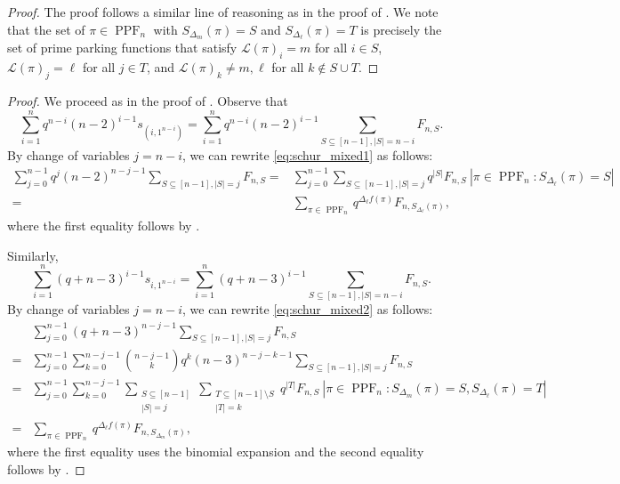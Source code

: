 \documentclass[12pt,reqno]{amsart}
\theoremstyle{definition}
\theoremstyle{remark}
\newcommand{\fd}{\Delta_{\ell} f}
\newcommand{\SetL}[1]{S_{\Delta_{#1}}}
\newcommand{\mL}{\mathcal{L}}
\DeclareMathOperator{\PPF}{PPF}
\begin{document}
\begin{proof}
The proof follows a similar line of reasoning as in the proof of . We note that the set of $\pi\in\PPF_n$ with $\SetL{m}(\pi)=S$ and $\SetL{\ell}(\pi)=T$ is precisely the set of prime parking functions that satisfy $\mL(\pi)_i=m$ for all $i\in S$, $\mL(\pi)_j=\ell$ for all $j\in T$, and $\mL(\pi)_k\not=m,\ell$ for all $k\not\in S \cup T.$
\end{proof}

\PPFQuasiSymmetric*

\begin{proof}
We proceed as in the proof of . Observe that
\begin{equation}
\label{eq:schur_mixed1}
\sum_{i=1}^n q^{n-i}(n-2)^{i-1} s_{(i,1^{n-i})}= \sum_{i=1}^n q^{n-i}(n-2)^{i-1} \sum_{S\subseteq [n-1], |S|=n-i}F_{n,S}.
\end{equation}
By change of variables $j=n-i$, we can rewrite \eqref{eq:schur_mixed1} as follows:
\begin{align*}
    \sum_{j=0}^{n-1} q^j (n-2)^{n-j-1} \sum_{S\subseteq [n-1], |S|=j} F_{n,S}
    =&\sum_{j=0}^{n-1}  \sum_{S\subseteq [n-1], |S|=j}  q^{|S|} F_{n,S} ~|\pi \in \PPF_n : \SetL{\ell}(\pi)=S|\\
    =&\sum_{\pi \in \PPF_n} q^{\fd(\pi)} F_{n,\SetL{\ell}(\pi)},
\end{align*}
where the first equality follows by .

Similarly,
\begin{equation}
\label{eq:schur_mixed2}
\sum_{i=1}^n (q+n-3)^{i-1}s_{i,1^{n-i}}= \sum_{i=1}^n (q+n-3)^{i-1} \sum_{S\subseteq [n-1], |S|=n-i}F_{n,S}.
\end{equation}
By change of variables $j=n-i$, we can rewrite \eqref{eq:schur_mixed2} as follows:
\begin{align*}
    &\sum_{j=0}^{n-1} (q+n-3)^{n-j-1} \sum_{S\subseteq [n-1], |S|=j} F_{n,S}\\
    =&\sum_{j=0}^{n-1} \sum_{k=0}^{n-j-1} \binom{n-j-1}{k} q^k (n-3)^{n-j-k-1} \sum_{S\subseteq [n-1], |S|=j}  F_{n,S}\\
    =&\sum_{j=0}^{n-1} \sum_{k=0}^{n-j-1}   \sum_{\substack{S\subseteq [n-1] \\ |S|=j}} \sum_{\substack{T \subseteq [n-1]\setminus S \\ |T|=k}} q^{|T|} F_{n,S} ~|\pi \in \PPF_n : \SetL{m}(\pi)=S, \SetL{\ell}(\pi)=T| \\
    =&\sum_{\pi \in \PPF_n} q^{
\fd(\pi)} F_{n, \SetL{m}(\pi)},
\end{align*}
where the first equality uses the binomial expansion and the second equality follows by .
\end{proof}
\end{document}
